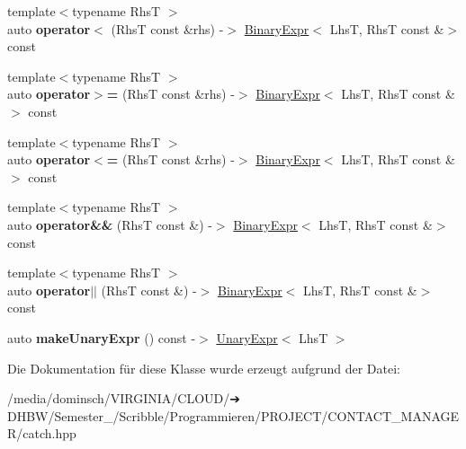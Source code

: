 \begin{DoxyCompactItemize}
\item 
\mbox{\label{classCatch_1_1ExprLhs_a55284221df2edb3542e765c87b5691b9}} 
{\footnotesize template$<$typename RhsT $>$ }\\auto {\bfseries operator$<$} (RhsT const \&rhs) -\/$>$ \hyperlink{classCatch_1_1BinaryExpr}{Binary\+Expr}$<$ LhsT, RhsT const \&$>$ const
\item 
\mbox{\label{classCatch_1_1ExprLhs_aff594ae5b957105c517a6257d2e730f0}} 
{\footnotesize template$<$typename RhsT $>$ }\\auto {\bfseries operator$>$=} (RhsT const \&rhs) -\/$>$ \hyperlink{classCatch_1_1BinaryExpr}{Binary\+Expr}$<$ LhsT, RhsT const \&$>$ const
\item 
\mbox{\label{classCatch_1_1ExprLhs_a6bd8a22c1a7fe2f66d71d7196f20af4f}} 
{\footnotesize template$<$typename RhsT $>$ }\\auto {\bfseries operator$<$=} (RhsT const \&rhs) -\/$>$ \hyperlink{classCatch_1_1BinaryExpr}{Binary\+Expr}$<$ LhsT, RhsT const \&$>$ const
\item 
\mbox{\label{classCatch_1_1ExprLhs_a5d85cdd34a136c37fa5e5283c2ff54d5}} 
{\footnotesize template$<$typename RhsT $>$ }\\auto {\bfseries operator\&\&} (RhsT const \&) -\/$>$ \hyperlink{classCatch_1_1BinaryExpr}{Binary\+Expr}$<$ LhsT, RhsT const \&$>$ const
\item 
\mbox{\label{classCatch_1_1ExprLhs_a33e5f813f5c236b9b77d977c04266f4d}} 
{\footnotesize template$<$typename RhsT $>$ }\\auto {\bfseries operator$\vert$$\vert$} (RhsT const \&) -\/$>$ \hyperlink{classCatch_1_1BinaryExpr}{Binary\+Expr}$<$ LhsT, RhsT const \&$>$ const
\item 
\mbox{\label{classCatch_1_1ExprLhs_ab68bd6d5d3ae21b7fba9010150fba95d}} 
auto {\bfseries make\+Unary\+Expr} () const -\/$>$ \hyperlink{classCatch_1_1UnaryExpr}{Unary\+Expr}$<$ LhsT $>$
\end{DoxyCompactItemize}


Die Dokumentation für diese Klasse wurde erzeugt aufgrund der Datei\+:\begin{DoxyCompactItemize}
\item 
/media/dominsch/\+V\+I\+R\+G\+I\+N\+I\+A/\+C\+L\+O\+U\+D/➔ D\+H\+B\+W/\+Semester\+\_/\+Scribble/\+Programmieren/\+P\+R\+O\+J\+E\+C\+T/\+C\+O\+N\+T\+A\+C\+T\+\_\+\+M\+A\+N\+A\+G\+E\+R/catch.\+hpp\end{DoxyCompactItemize}
